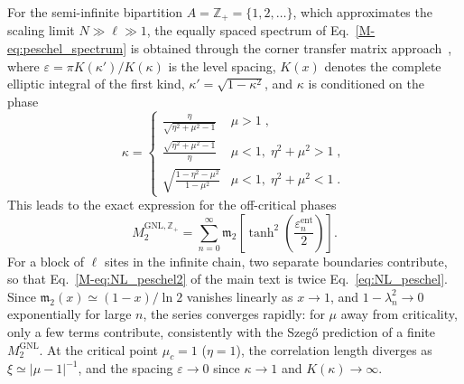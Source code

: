 \documentclass[aps,prl,twocolumn,superscriptaddress,reprint,longbibliography,nofootinbib]{revtex4-2}
\begin{document}
For the semi-infinite bipartition $A=\mathbb{Z}_+=\{1,2,\dots\}$, which approximates the scaling limit $N\gg\ell\gg1$, the equally spaced spectrum of Eq.~\eqref{M-eq:peschel_spectrum} is obtained through the corner transfer matrix approach~\cite{Peschel2009,Eisler2017}, where $\varepsilon = \pi K(\kappa')/K(\kappa)$ is the level spacing, $K(x)$ denotes the complete elliptic integral of the first kind, $\kappa' = \sqrt{1-\kappa^2}$, and $\kappa$ is conditioned on the phase~\cite{Peschel2009}
\begin{equation}
    \kappa = \begin{cases}
        \displaystyle\frac{\eta}{\sqrt{\eta^2 + \mu^2 - 1}} & \mu > 1 \;,\\[8pt]
        \displaystyle\frac{\sqrt{\eta^2 + \mu^2 - 1}}{\eta} & \mu < 1,\; \eta^2 + \mu^2 > 1\;,\\[8pt]
        \displaystyle\sqrt{\frac{1 - \eta^2 - \mu^2}{1 - \mu^2}} & \mu < 1,\; \eta^2 + \mu^2 < 1\;.
    \end{cases}
    \label{eq:elliptic_modulus}
\end{equation}
This leads to the exact expression for the off-critical phases
\begin{equation}
    M_2^{\mathrm{GNL},\mathbb{Z}_+} = \sum_{n=0}^{\infty} \mathfrak{m}_2\!\left[\tanh^2\left(\frac{\varepsilon_n^{\mathrm{ent}}}{2}\right)\right].
    \label{eq:NL_peschel}
\end{equation}
For a block of $\ell$ sites in the infinite chain, two separate boundaries contribute, so that Eq.~\eqref{M-eq:NL_peschel2} of the main text is twice Eq.~\eqref{eq:NL_peschel}. Since $\mathfrak{m}_2(x)\simeq(1-x)/\ln 2$ vanishes linearly as $x \to 1$, and $1-\lambda_n^2 \to 0$ exponentially for large $n$, the series converges rapidly: for $\mu$ away from criticality, only a few terms contribute, consistently with the Szeg\H{o} prediction of a finite $M_2^{\mathrm{GNL}}$. At the critical point $\mu_c=1$ ($\eta=1$), the correlation length diverges as $\xi\simeq |\mu-1|^{-1}$, and the spacing $\varepsilon \to 0$ since $\kappa \to 1$ and $K(\kappa) \to \infty$.
\end{document}
